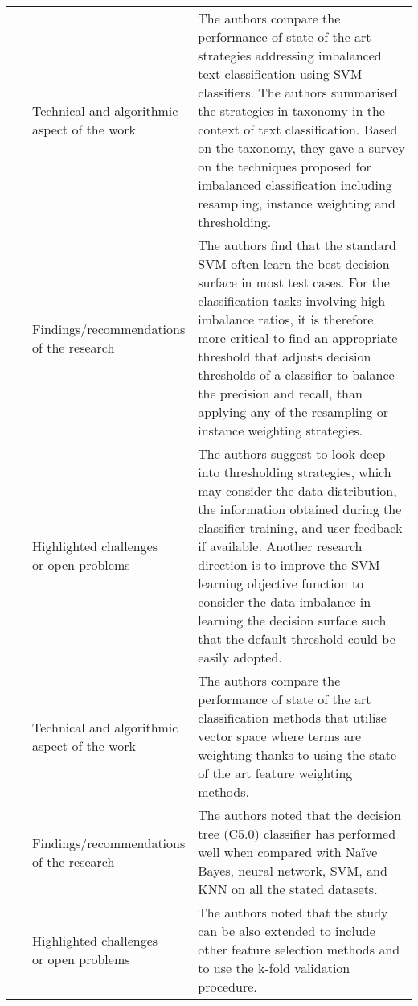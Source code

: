 \begin{landscape}
\begin{longtable}{lp{}p{}}
	\multirow{3}[0]{*}{~\citep{Sun2009}} & 
    \specialcell{Technical and algorithmic \\ aspect of the work} &
    The authors compare the performance of state of the art strategies addressing imbalanced text classification using SVM classifiers. The authors summarised the strategies in taxonomy in the context of text classification. Based on the taxonomy, they gave a survey on the techniques proposed for imbalanced classification including resampling, instance weighting and thresholding.  
    \\ & 
    \specialcell{Findings/recommendations \\ of the research} & 
    The authors find that the standard SVM often learn the best decision surface in most test cases. For the classification tasks involving high imbalance ratios, it is therefore more critical to find an appropriate threshold that adjusts decision thresholds of a classifier to balance the precision and recall, than applying any of the resampling or instance weighting strategies. 
    \\ & 
    \specialcell{Highlighted challenges \\ or open problems} & 
    The authors suggest to look deep into thresholding strategies, which may consider the data distribution, the information obtained during the classifier training, and user feedback if available. Another research direction is to improve the SVM learning objective function to consider the data imbalance in learning the decision surface such that the default threshold could be easily adopted.
    \\
    
	\multirow{3}[0]{*}{~\citep{Bramesh2019}} & 
    \specialcell{Technical and algorithmic \\ aspect of the work} &
    The authors compare the performance of state of the art classification methods that utilise vector space where terms are weighting thanks to using the state of the art feature weighting methods.      
    \\ & 
    \specialcell{Findings/recommendations \\ of the research} & 
    The authors noted that the decision tree (C5.0) classifier has performed well when compared with Naïve Bayes, neural network, SVM, and KNN on all the stated datasets.
    \\ & 
    \specialcell{Highlighted challenges \\ or open problems} & 
    The authors noted that the study can be also extended to include other feature selection methods and to use the k-fold validation procedure. 
	\\
	

\end{longtable}
\end{landscape}
